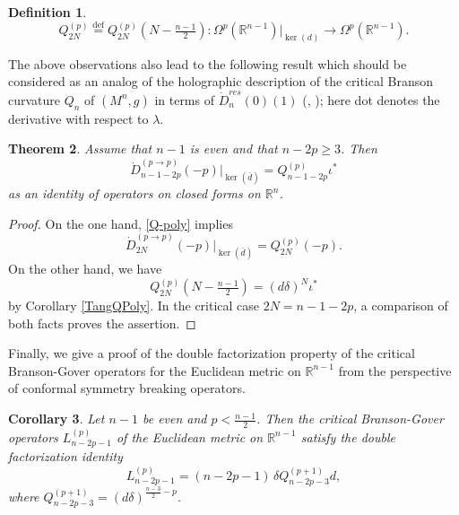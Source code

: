 \documentclass[a4paper,12pt,reqno]{amsart}
\newtheorem{theorem}{Theorem}
\newtheorem{cor}[theorem]{Corollary}
\newtheorem{defn}[theorem]{Definition}
\numberwithin{theorem}{subsection}
\numberwithin{equation}{section}
\begin{document}
\begin{defn}\label{Q-curvature}
\begin{equation}
   Q_{2N}^{(p)} {\stackrel{\text{def}}{=}} Q_{2N}^{(p)}(N-\tfrac{n-1}{2}):
   \Omega^p({\mathbb{R}}^{n-1})|_{\ker({d})} \to \Omega^p({\mathbb{R}}^{n-1}).
\end{equation}
\end{defn}

The above observations also lead to the following result which should be
considered as an analog of the holographic description of the critical Branson
curvature $Q_n$ of $(M^n,g)$ in terms of $\dot{D}_n^{res}(0)(1)$ (\cite{Juhl},
\cite{JG-holo}); here dot denotes the derivative with respect to $\lambda$.

\begin{theorem}\label{holo-formula} Assume that $n-1$ is even and that $n-2p \ge 3$.
Then
\begin{equation}\label{holo}
   \dot{D}_{n-1-2p}^{(p \to p)}(-p)|_{\ker (\bar{d})} = Q_{n-1-2p}^{(p)} \iota^*
\end{equation}
as an identity of operators on closed forms on ${\mathbb{R}}^n$.
\end{theorem}

\begin{proof} On the one hand, \eqref{Q-poly} implies
$$
   \dot{D}_{2N}^{(p \to p)}(-p)|_{\ker (\bar{d})} = Q_{2N}^{(p)}(-p).
$$
On the other hand, we have
$$
   Q_{2N}^{(p)}(N-\tfrac{n-1}{2}) = ({d}\delta)^N \iota^*
$$
by Corollary \ref{TangQPoly}. In the critical case $2N=n-1-2p$, a comparison of
both facts proves the assertion.
\end{proof}

Finally, we give a proof of the double factorization property of the critical
Branson-Gover operators for the Euclidean metric on ${\mathbb{R}}^{n-1}$ from the
perspective of conformal symmetry breaking operators.

\begin{cor}\label{OneSideFact} Let $n-1$ be even and $p < \frac{n-1}{2}$. Then the
critical Branson-Gover operators $L_{n-2p-1}^{(p)}$ of the Euclidean metric on
${\mathbb{R}}^{n-1}$ satisfy the double factorization identity
\begin{equation*}
   L_{n-2p-1}^{(p)} = (n\!-\!2p\!-\!1) \, \delta Q^{(p+1)}_{n-2p-3} {d},
\end{equation*}
where $Q_{n-2p-3}^{(p+1)}=({d}\delta)^{\frac{n-3}{2}-p}$.
\end{cor}
\end{document}
